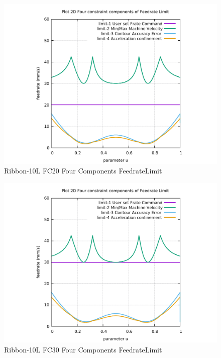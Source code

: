\begin{figure}
	\caption     {Ribbon-10L FC20 Four Components FeedrateLimit}
	\label{32-img-Ribbon-10L-FC20-Four-Components-FeedrateLimit.pdf}
\includegraphics[width=1.00\textwidth]{Chap4/appendix/app-Ribbon-10L/plots/32-img-Ribbon-10L-FC20-Four-Components-FeedrateLimit.pdf}
\end{figure}


\clearpage
\pagebreak

\begin{figure}
	\caption     {Ribbon-10L FC30 Four Components FeedrateLimit}
	\label{33-img-Ribbon-10L-FC30-Four-Components-FeedrateLimit.pdf}
\includegraphics[width=1.00\textwidth]{Chap4/appendix/app-Ribbon-10L/plots/33-img-Ribbon-10L-FC30-Four-Components-FeedrateLimit.pdf}
\end{figure}


